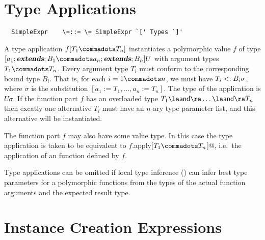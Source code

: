 \documentclass[11pt]{report}
\begin{document}

\section{Type Applications}
\label{sec:type-app}
\syntax\begin{verbatim}
  SimpleExpr    \=::= \= SimpleExpr `[' Types `]'
\end{verbatim}

A type application $f[T_1\commadots T_n]$ instantiates a polymorphic
value $f$ of type $[a_1 \extends B_1 \commadots a_n \extends B_n] U$ with
argument types $T_1 \commadots T_n$.  Every argument type $T_i$ must
conform to the corresponding bound type $B_i$. That is, for each $i = 1
\commadots n$, we must have $T_i <: B_i\sigma$, where $\sigma$ is
the substitution $[a_1 := T_1, ..., a_n := T_n]$.  The type of the
application is $U\sigma$.  If the function part $f$ has an overloaded
type $T_1 \overload \ldots \overload T_n$ then excatly one alternative
$T_i$ must have an $n$-ary type parameter list, and this alternative
will be instantiated.

The function part $f$ may also have some value type. In this case the
type application is taken to be equivalent to
\verb@$f$.apply[$T_1\commadots T_n$]@,
i.e.\ the application of an \verb@apply@ function defined by $f$.

Type applications can be omitted if local type inference
() can infer best type parameters for a
polymorphic functions from the types of the actual function arguments
and the expected result type.

\section{Instance Creation Expressions}
\label{sec:inst-creation}
\end{document}
